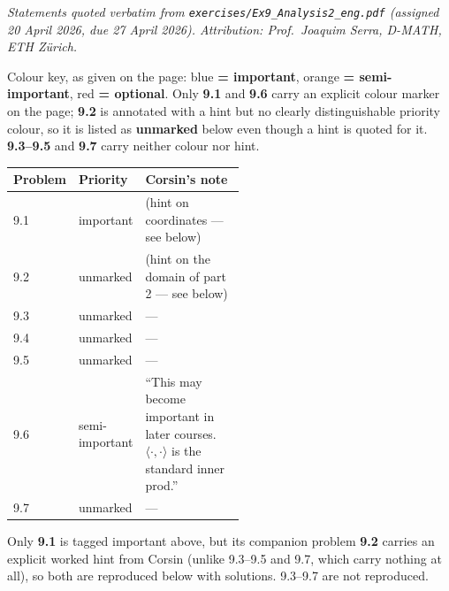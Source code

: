 
\textit{Statements quoted verbatim from \texttt{exercises/Ex9\_Analysis2\_eng.pdf} (assigned
20 April 2026, due 27 April 2026). Attribution: Prof.\ Joaquim Serra, D-MATH, ETH Z\"urich.}

\begin{ainote}
Colour key, as given on the page: blue \textbf{= important}, orange \textbf{= semi-important},
red \textbf{= optional}. Only \textbf{9.1} and \textbf{9.6} carry an explicit colour marker
on the page; \textbf{9.2} is annotated with a hint but no clearly distinguishable priority
colour, so it is listed as \textbf{unmarked} below even though a hint is quoted for it.
\textbf{9.3--9.5} and \textbf{9.7} carry neither colour nor hint.

\begin{center}
\begin{tabular}{@{}l l p{0.52\linewidth}@{}}
\textbf{Problem} & \textbf{Priority} & \textbf{Corsin's note} \\
\hline
9.1 & important & (hint on coordinates --- see below) \\[3pt]
9.2 & unmarked & (hint on the domain of part 2 --- see below) \\[3pt]
9.3 & unmarked & --- \\[3pt]
9.4 & unmarked & --- \\[3pt]
9.5 & unmarked & --- \\[3pt]
9.6 & semi-important & ``This may become important in later courses. $\langle\cdot,\cdot\rangle$
  is the standard inner prod.'' \\[3pt]
9.7 & unmarked & --- \\
\end{tabular}
\end{center}
\end{ainote}

\begin{ainote}
Only \textbf{9.1} is tagged important above, but its companion problem \textbf{9.2} carries
an explicit worked hint from Corsin (unlike 9.3--9.5 and 9.7, which carry nothing at all), so
both are reproduced below with solutions. 9.3--9.7 are not reproduced.
\end{ainote}

